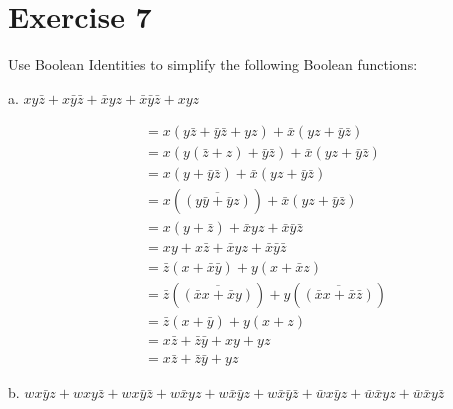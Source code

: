 \documentclass{article}
\begin{document}
    \section{Exercise 7}
    \begin{flushleft}
        Use Boolean Identities to simplify the following Boolean functions:
    \end{flushleft}
    \begin{flushleft}
        a. $xy\bar{z} + x\bar{y}\bar{z} + \bar{x}yz + \bar{x}\bar{y}\bar{z} + xyz$
    \end{flushleft}
    \begin{align*}
        &= x(y\bar{z} + \bar{y}\bar{z} + yz) + \bar{x}(yz + \bar{y}\bar{z}) \\
        &= x(y(\bar{z} + z) + \bar{y}\bar{z}) + \bar{x}(yz + \bar{y}\bar{z}) \\
        &= x(y + \bar{y}\bar{z}) + \bar{x}(yz + \bar{y}\bar{z}) \\
        &= x(\overline{(y\bar{y} + \bar{y}z)}) + \bar{x}(yz + \bar{y}\bar{z}) \\
        &= x(y  + \bar{z}) + \bar{x}yz + \bar{x}\bar{y}\bar{z} \\
        &= xy + x\bar{z} + \bar{x}yz + \bar{x}\bar{y}\bar{z} \\
        &= \bar{z}(x + \bar{x}\bar{y}) + y(x + \bar{x}z) \\
        &= \bar{z}(\overline{(\bar{x}x + \bar{x}y)}) + y(\overline{(\bar{x}x + \bar{x}\bar{z})}) \\
        &= \bar{z}(x + \bar{y}) + y(x + z) \\
        &= x\bar{z} + \bar{z}\bar{y} + xy + yz \\
        &= x\bar{z} + \bar{z}\bar{y} + yz
    \end{align*}
    \begin{flushleft}
        b. $wx\bar{y}z + wxy\bar{z} + wx\bar{y}\bar{z} + w\bar{x}yz + w\bar{x}\bar{y}z + w\bar{x}\bar{y}\bar{z} + \bar{w}x\bar{y}z + \bar{w}\bar{x}yz + \bar{w}\bar{x}y\bar{z}$
    \end{flushleft}
\end{document}

